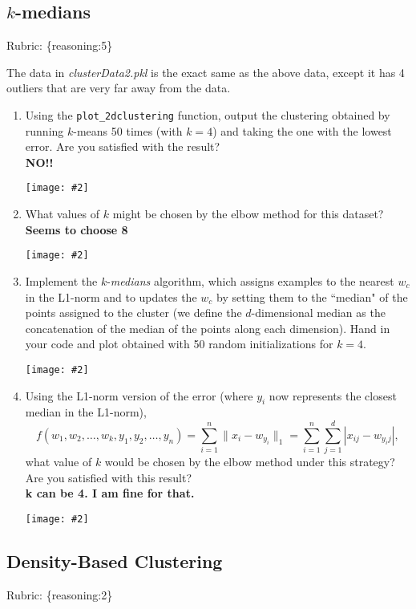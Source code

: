 \documentclass{article}
\def\blu#1{{\color{blu}#1}}
\def\gre#1{{\color{gre}#1}}
\def\norm#1{\|#1\|}
\newcommand{\centerfig}[2]{\begin{center}\texttt{[image: \#2]}\end{center}}
\def\enum#1{\begin{enumerate}#1\end{enumerate}}
\def\rubric#1{\gre{Rubric: \{#1\}}}{}
\begin{document}
 \subsection{$k$-medians}
\rubric{reasoning:5}

 The data in \emph{clusterData2.pkl} is the exact same as the above data, except it has 4 outliers that are very far away from the data.

 \blu{\enum{
 \item Using the \texttt{plot\_2dclustering} function, output the clustering obtained by running $k$-means 50 times (with $k=4$)  and taking the one with the lowest error. Are you satisfied with the result?\\
 \textbf{NO!!}
   \centerfig{.5}{../figs/q3_3.png}
 \item What values of $k$ might be chosen by the elbow method for this dataset?\\\textbf{Seems to choose 8}
    \centerfig{.5}{../figs/k_elbow_3_3_3.png}
 \item Implement the $k$-\emph{medians} algorithm, which assigns examples to the nearest $w_c$ in the L1-norm and to updates the $w_c$ by setting them to the ``median" of the points assigned to the cluster (we define the $d$-dimensional median as the concatenation of the median of the points along each dimension). Hand in your code and plot obtained with 50 random initializations for $k = 4$.\\
   \centerfig{.5}{../figs/q3_3_3.png}
\item Using the L1-norm version of the error (where $y_i$ now represents the closest median in the L1-norm),
\[
f(w_1,w_2,\dots,w_k,y_1,y_2,\dots,y_n) = \sum_{i=1}^n \norm{x_i - w_{y_i}}_1 = \sum_{i=1}^n \sum_{j=1}^d |x_{ij} - w_{y_ij}|,
\]
what value of $k$ would be chosen by the elbow method under this strategy? Are you satisfied with this result?\\\textbf{k can be 4. I am fine for that.}
   \centerfig{.5}{../figs/k_elbow_3_3_4.png}
}
}

\subsection{Density-Based Clustering}
\rubric{reasoning:2}
\end{document}
